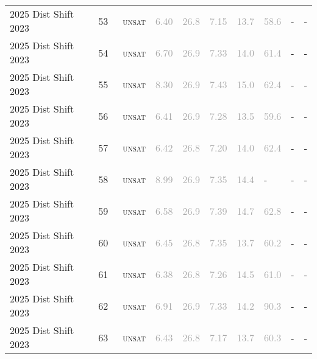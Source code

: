 \begin{center}
{\begin{longtable}{@{}llllllllll@{}}
2025 Dist Shift 2023 & 53 & ~\textsc{unsat} & \textcolor{darkgray}{6.40} & \textcolor{darkgray}{26.8} & \textcolor{darkgray}{7.15} & \textcolor{darkgray}{13.7} & \textcolor{darkgray}{58.6} & - & - \\
2025 Dist Shift 2023 & 54 & ~\textsc{unsat} & \textcolor{darkgray}{6.70} & \textcolor{darkgray}{26.9} & \textcolor{darkgray}{7.33} & \textcolor{darkgray}{14.0} & \textcolor{darkgray}{61.4} & - & - \\
2025 Dist Shift 2023 & 55 & ~\textsc{unsat} & \textcolor{darkgray}{8.30} & \textcolor{darkgray}{26.9} & \textcolor{darkgray}{7.43} & \textcolor{darkgray}{15.0} & \textcolor{darkgray}{62.4} & - & - \\
2025 Dist Shift 2023 & 56 & ~\textsc{unsat} & \textcolor{darkgray}{6.41} & \textcolor{darkgray}{26.9} & \textcolor{darkgray}{7.28} & \textcolor{darkgray}{13.5} & \textcolor{darkgray}{59.6} & - & - \\
2025 Dist Shift 2023 & 57 & ~\textsc{unsat} & \textcolor{darkgray}{6.42} & \textcolor{darkgray}{26.8} & \textcolor{darkgray}{7.20} & \textcolor{darkgray}{14.0} & \textcolor{darkgray}{62.4} & - & - \\
2025 Dist Shift 2023 & 58 & ~\textsc{unsat} & \textcolor{darkgray}{8.99} & \textcolor{darkgray}{26.9} & \textcolor{darkgray}{7.35} & \textcolor{darkgray}{14.4} & - & - & - \\
2025 Dist Shift 2023 & 59 & ~\textsc{unsat} & \textcolor{darkgray}{6.58} & \textcolor{darkgray}{26.9} & \textcolor{darkgray}{7.39} & \textcolor{darkgray}{14.7} & \textcolor{darkgray}{62.8} & - & - \\
2025 Dist Shift 2023 & 60 & ~\textsc{unsat} & \textcolor{darkgray}{6.45} & \textcolor{darkgray}{26.8} & \textcolor{darkgray}{7.35} & \textcolor{darkgray}{13.7} & \textcolor{darkgray}{60.2} & - & - \\
2025 Dist Shift 2023 & 61 & ~\textsc{unsat} & \textcolor{darkgray}{6.38} & \textcolor{darkgray}{26.8} & \textcolor{darkgray}{7.26} & \textcolor{darkgray}{14.5} & \textcolor{darkgray}{61.0} & - & - \\
2025 Dist Shift 2023 & 62 & ~\textsc{unsat} & \textcolor{darkgray}{6.91} & \textcolor{darkgray}{26.9} & \textcolor{darkgray}{7.33} & \textcolor{darkgray}{14.2} & \textcolor{darkgray}{90.3} & - & - \\
2025 Dist Shift 2023 & 63 & ~\textsc{unsat} & \textcolor{darkgray}{6.43} & \textcolor{darkgray}{26.8} & \textcolor{darkgray}{7.17} & \textcolor{darkgray}{13.7} & \textcolor{darkgray}{60.3} & - & - \\

\end{longtable}}
\end{center}

